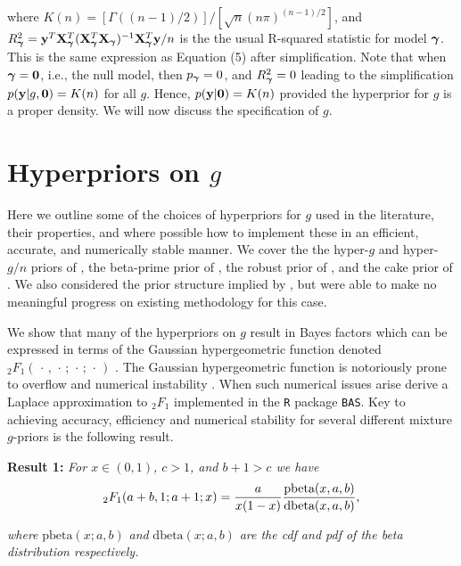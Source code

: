 \noindent where $K(n) = [\Gamma( (n-1)/2 )]/[\sqrt{n}(n\pi)^{(n-1)/2}]$, and
$R_{\boldsymbol \gamma}^2 =
{\bf y}^T{\bf X}_{\boldsymbol \gamma}^T({\bf X}_{\boldsymbol \gamma}^T{\bf X}_{\boldsymbol \gamma})^{-1}{\bf X}_{\boldsymbol \gamma}^T{\bf y}/n$ is the the
usual R-squared statistic for model ${\boldsymbol \gamma}$.  This is the same expression as
\cite{Liang2008} Equation (5) after simplification. Note that when ${\boldsymbol \gamma} =
{\bf 0}$, i.e., the null model, then $p_{\boldsymbol \gamma} = 0$, and $R_{\boldsymbol \gamma}^2 = 0$
leading to the simplification $p({\bf y}|g,{\bf 0}) = K(n)$ for all $g$. Hence,
$p({\bf y}|{\bf 0}) = K(n)$ provided the hyperprior for $g$ is a proper density. We
will now discuss the specification of $g$.


\section{Hyperpriors on $g$}
\label{sec:hyperpriors}

Here we outline some of the choices of hyperpriors for $g$ used in the
literature, their properties, and where possible how to implement these in an
efficient, accurate, and numerically stable manner. We cover the the hyper-$g$
and hyper-$g/n$ priors of \cite{Liang2008}, the beta-prime prior of
\cite{Maruyama2011}, the robust prior of \cite{Bayarri2012}, and the cake prior
of \cite{OrmerodEtal2017}.  We also considered the prior structure implied by
\cite{Zellner1980}, but were able to make no meaningful progress on existing
methodology for this case.

We show that many of the hyperpriors on $g$ result in Bayes factors which can
be expressed in terms of the Gaussian hypergeometric function denoted
${}_2F_1(\,\cdot\,,\,\cdot\,;\,\cdot\,;\,\cdot\,)$ \citep[see for example
Chapter 15 of ][]{Abramowitz1972}.  The Gaussian hypergeometric function is
notoriously prone to overflow and numerical instability \citep{Pearson2017}.
When such numerical issues arise \cite{Liang2008} derive a Laplace
approximation to ${}_2F_1$ implemented in the {\tt R} package {\tt BAS}.  Key
to achieving accuracy, efficiency and numerical stability for several different
mixture $g$-priors is the following result.

 
\noindent 
{\bf Result 1:} {\it For $x\in(0,1)$, $c>1$, and $b +1 > c$ we have}
\begin{equation}\label{eq:logGuassHypergeometric2}
	\displaystyle {}_2F_1(a+b,1;a+1;x) = \frac{a}{x(1 - x)}   \frac{\mbox{pbeta}(x,a,b)}{\mbox{dbeta}(x,a,b)},
\end{equation}

\noindent 
{\it where} $\mbox{pbeta}(x;a,b)$ {\it and} $\mbox{dbeta}(x;a,b)$ {\it are the cdf and pdf of the beta 
	distribution respectively.}

